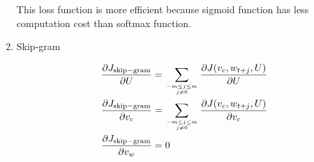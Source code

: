 \documentclass{article}
\begin{document}
\begin{enumerate}[label=(\alph*)]
	This loss function is more efficient because sigmoid function has less computation cost than softmax function.
	
	\item Skip-gram
	
	\begin{align}
		\frac{\partial J_\mathrm{skip-gram}}{\partial U} &= \sum_{-m\leq j\leq m\atop j\neq 0} \frac{\partial J(v_c, w_{t+j}, U)}{\partial U} \\
		\frac{\partial J_\mathrm{skip-gram}}{\partial v_c} &= \sum_{-m\leq j\leq m\atop j\neq 0} \frac{\partial J(v_c, w_{t+j}, U)}{\partial v_c} \\
		\frac{\partial J_\mathrm{skip-gram}}{\partial v_w} &= 0
	\end{align}
\end{enumerate}
\end{document}
